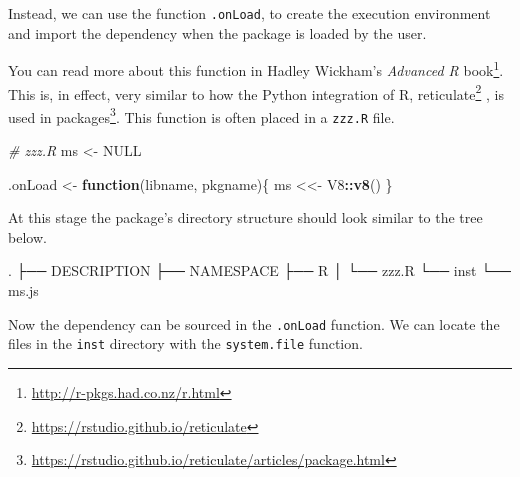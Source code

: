 \documentclass[10pt,]{krantz}
\makeatletter
\newenvironment{Shaded}{\begin{snugshade}}{\end{snugshade}}
\newcommand{\CommentTok}[1]{\textcolor[rgb]{0.37,0.37,0.37}{\textit{#1}}}
\newcommand{\ControlFlowTok}[1]{\textcolor[rgb]{0.27,0.27,0.27}{\textbf{#1}}}
\newcommand{\DataTypeTok}[1]{\textcolor[rgb]{0.27,0.27,0.27}{#1}}
\newcommand{\ExtensionTok}[1]{#1}
\newcommand{\KeywordTok}[1]{\textcolor[rgb]{0.27,0.27,0.27}{\textbf{#1}}}
\newcommand{\NormalTok}[1]{#1}
\newcommand{\OperatorTok}[1]{\textcolor[rgb]{0.43,0.43,0.43}{\textbf{#1}}}
\newcommand{\OtherTok}[1]{\textcolor[rgb]{0.37,0.37,0.37}{#1}}
\newcommand{\StringTok}[1]{\textcolor[rgb]{0.5,0.5,0.5}{#1}}
\renewcommand{\href}[2]{#2\footnote{\url{#1}}}
\newenvironment{kframe}{%
\medskip{}
\setlength{\fboxsep}{.8em}
 \def\at@end@of@kframe{}%
 \ifinner\ifhmode%
  \def\at@end@of@kframe{\end{minipage}}%
  \begin{minipage}{\columnwidth}%
 \fi\fi%
 \def\FrameCommand##1{\hskip\@totalleftmargin \hskip-\fboxsep
 \colorbox{shadecolor}{##1}\hskip-\fboxsep
     \hskip-\linewidth \hskip-\@totalleftmargin \hskip\columnwidth}%
 \MakeFramed {\advance\hsize-\width
   \@totalleftmargin\z@ \linewidth\hsize
   \@setminipage}}%
 {\par\unskip\endMakeFramed%
 \at@end@of@kframe}
\renewenvironment{Shaded}{\begin{kframe}}{\end{kframe}}
\makeatother
\begin{document}
Instead, we can use the function \texttt{.onLoad}, to create the execution environment and import the dependency when the package is loaded by the user.

You can read more about this function in Hadley Wickham's \href{http://r-pkgs.had.co.nz/r.html}{\emph{Advanced R} book}. This is, in effect, very similar to how the Python integration of R, \href{https://rstudio.github.io/reticulate}{reticulate} \citep{R-reticulate}, is \href{https://rstudio.github.io/reticulate/articles/package.html}{used in packages}. This function is often placed in a \texttt{zzz.R} file.

\begin{Shaded}
\begin{Highlighting}[]
\CommentTok{# zzz.R}
\NormalTok{ms <-}\StringTok{ }\OtherTok{NULL}

\NormalTok{.onLoad <-}\StringTok{ }\ControlFlowTok{function}\NormalTok{(libname, pkgname)\{}
\NormalTok{  ms <<-}\StringTok{ }\NormalTok{V8}\OperatorTok{::}\KeywordTok{v8}\NormalTok{()}
\NormalTok{\}}
\end{Highlighting}
\end{Shaded}

At this stage the package's directory structure should look similar to the tree below.

\begin{Shaded}
\begin{Highlighting}[]
\ExtensionTok{.}
\NormalTok{├── }\ExtensionTok{DESCRIPTION}
\NormalTok{├── }\ExtensionTok{NAMESPACE}
\NormalTok{├── }\ExtensionTok{R}
\NormalTok{│   └── }\ExtensionTok{zzz.R}
\NormalTok{└── }\ExtensionTok{inst}
\NormalTok{    └── }\ExtensionTok{ms.js}
\end{Highlighting}
\end{Shaded}

Now the dependency can be sourced in the \texttt{.onLoad} function. We can locate the files in the \texttt{inst} directory with the \texttt{system.file} function.

\begin{Shaded}
\end{Shaded}
\end{document}
